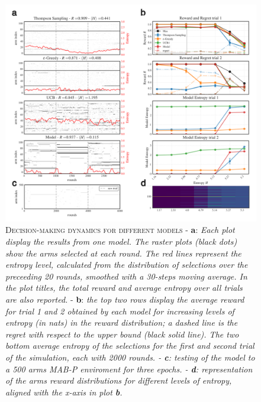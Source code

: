 \begin{figure}[H]
    \centering
    \includegraphics[width=1.0\textwidth]{figures/entropy_main_plot_2.png}
    \caption{\textsc{Decision-making dynamics for different models} - \textbf{a}: \textit{Each plot display the results from one model. The raster plots (black dots) show the arms selected at each round.
The red lines represent the entropy level, calculated from the distribution of selections over the preceeding 20 rounds, smoothed with a 30-steps moving average. In the plot titles, the total reward and average entropy over all trials are also reported.}
 - \textbf{b}: \textit{the top two rows display  the average reward for trial 1 and 2 obtained by each model for increasing levels of entropy (in nats) in the reward distribution; a dashed line is the regret with respect to the upper bound (black solid line). The two bottom average entropy of the selections for the first and second trial of the simulation, each with 2000 rounds. -
\textbf{c}: \textit{testing of the model to a 500 arms MAB-P enviroment for three epochs. - \textbf{d}: representation of the arms reward distributions for different levels of entropy, aligned with the x-axis in plot \textbf{b}.}}}
    \label{fig:entropy_fig1}
\end{figure}



